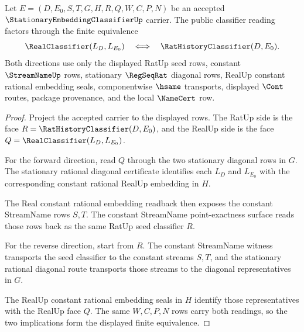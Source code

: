 \begin{theorem}
\label{thm:stationary-embedding-classifier-correspondence}
Let $E=(D,E_0,S,T,G,H,R,Q,W,C,P,N)$ be an accepted $\StationaryEmbeddingClassifierUp$ carrier. The public classifier reading factors through the finite equivalence
$$
\RealClassifier(L_D,L_{E_0})
\quad\Longleftrightarrow\quad
\RatHistoryClassifier(D,E_0).
$$
Both directions use only the displayed RatUp seed rows, constant $\StreamNameUp$ rows, stationary $\RegSeqRat$ diagonal rows, RealUp constant rational embedding seals, componentwise $\hsame$ transports, displayed $\Cont$ routes, package provenance, and the local $\NameCert$ row.
\end{theorem}
\begin{proof}
Project the accepted carrier to the displayed rows. The RatUp side is the face $R=\RatHistoryClassifier(D,E_0)$, and the RealUp side is the face $Q=\RealClassifier(L_D,L_{E_0})$.

For the forward direction, read $Q$ through the two stationary diagonal rows in $G$. The stationary rational diagonal certificate identifies each $L_D$ and $L_{E_0}$ with the corresponding constant rational RealUp embedding in $H$.

The Real constant rational embedding readback then exposes the constant StreamName rows $S,T$. The constant StreamName point-exactness surface reads those rows back as the same RatUp seed classifier $R$.

For the reverse direction, start from $R$. The constant StreamName witness transports the seed classifier to the constant streams $S,T$, and the stationary rational diagonal route transports those streams to the diagonal representatives in $G$.

The RealUp constant rational embedding seals in $H$ identify those representatives with the RealUp face $Q$. The same $W,C,P,N$ rows carry both readings, so the two implications form the displayed finite equivalence.
\end{proof}

